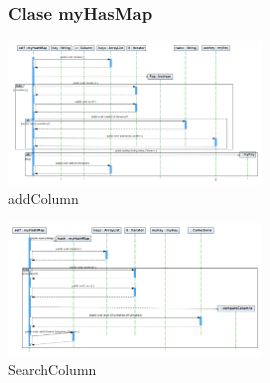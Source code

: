 \begin{figure}
\subsubsection{Clase myHasMap}
\centering
\includegraphics[angle=90, width=0.6\textwidth]{imgsSecuencia/myHasMap/addColumn.png}
\caption{addColumn}
\end{figure}
\newpage
\begin{figure}
\centering
\includegraphics[angle=90, width=0.6\textwidth]{imgsSecuencia/myHasMap/SearchColumn.png}
\caption{SearchColumn}
\end{figure}
\newpage



